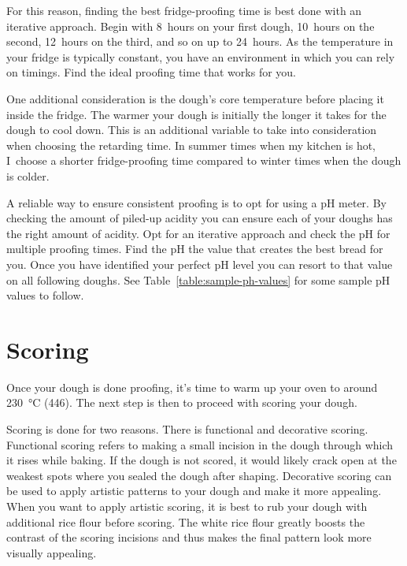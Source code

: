 For this reason, finding the best fridge-proofing time is best done
with an iterative approach. Begin with 8~hours on your first dough,
10~hours on the second, 12~hours on the third, and so on up to 24~hours.
As the temperature in your fridge is typically constant, you have an
environment in which you can rely on timings. Find the ideal proofing
time that works for you.

One additional consideration is the dough's core temperature before
placing it inside the fridge. The warmer your dough is initially
the longer it takes for the dough to cool down. This is an additional
variable to take into consideration when choosing the retarding time.
In summer times when my kitchen is hot, I~choose a shorter fridge-proofing
time compared to winter times when the dough is colder.

A reliable way to ensure consistent proofing is to opt for using a pH
meter. By checking the amount of piled-up acidity you can ensure
each of your doughs has the right amount of acidity. Opt for an iterative
approach and check the pH for multiple proofing times. Find the pH
the value that creates the best bread for you. Once you have identified
your perfect pH level you can resort to that value on all following
doughs. See Table~\ref{table:sample-ph-values} for some sample pH values
to follow.

\section{Scoring}

Once your dough is done proofing, it's time to warm up your oven
to around \qty{230}{\degreeCelsius} (\qty{446}{\degF}). The next step is then
to proceed with scoring your dough.

Scoring is done for two reasons. There is functional and decorative
scoring. Functional scoring refers to making a small incision in the dough
through which it rises while baking. If the dough is not scored,
it would likely crack open at the weakest spots where you sealed
the dough after shaping. Decorative scoring can be used to apply
artistic patterns to your dough and make it more appealing. When
you want to apply artistic scoring, it is best to rub your dough
with additional rice flour before scoring. The white rice flour
greatly boosts the contrast of the scoring incisions and thus
makes the final pattern look more visually appealing.

